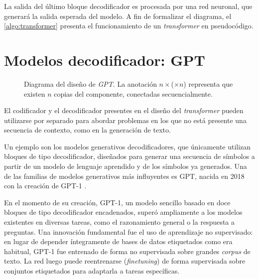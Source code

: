 La salida del último bloque decodificador es procesada por una red neuronal, que generará la salida esperada del modelo. A fin de formalizar el diagrama, el \cref{algo:transformer} presenta el funcionamiento de un \textit{transformer} en pseudocódigo.

\section{Modelos decodificador: GPT}
\begin{figure}[tb]
    \centering
    
    \caption{Diagrama del diseño de \textit{GPT}. La anotación \( n × \)(\( × n \)) representa que existen \( n \) copias del componente, conectadas secuencialmente.}
    \label{fig:gpt}
\end{figure}

El codificador y el decodificador presentes en el diseño del \textit{transformer} pueden utilizarse por separado para abordar problemas en los que no está presente una secuencia de contexto, como en la generación de texto. 

Un ejemplo son los modelos generativos decodificadores, que únicamente utilizan bloques de tipo decodificador, diseñados para generar una secuencia de símbolos a partir de un modelo de lenguaje aprendido y de los símbolos ya generados. Una de las familias de modelos generativos más influyentes es GPT, nacida en 2018 con la creación de GPT-1 \cite{radford2018improving}.

En el momento de su creación, GPT-1, un modelo sencillo basado en doce bloques de tipo decodificador encadenados, superó ampliamente a los modelos existentes en diversas tareas, como el razonamiento general o la respuesta a preguntas. Una innovación fundamental fue el uso de aprendizaje no supervisado: en lugar de depender íntegramente de bases de datos etiquetados como era habitual, GPT-1 fue entrenado de forma no supervisada sobre grandes \textit{corpus} de texto. La red luego puede reentrenarse (\textit{finetuning}) de forma supervisada sobre conjuntos etiquetados para adaptarla a tareas específicas.

